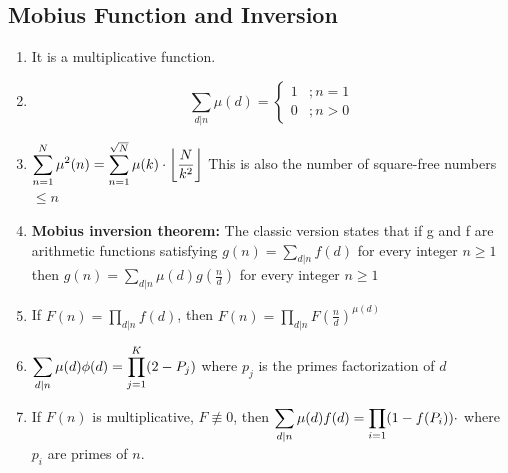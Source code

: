 \subsection{Mobius Function and Inversion}
\begin{enumerate}[resume]
    \item It is a multiplicative function.
    \item \[\sum_{d|n}\mu(d) =
    \begin{cases}
      1 & ; n=1\\
      0 & ; n > 0
    \end{cases}\]
    \item $\displaystyle \displaystyle \sum\limits_{n=1}^N {\mu}^2(n) = \displaystyle \sum\limits_{n=1}^{\sqrt{N}} \mu(k) \cdot \left \lfloor \dfrac{N}{k^2} \right\rfloor$
    This is also the number of square-free numbers $\displaystyle \le n$
    \item \textbf{Mobius inversion theorem:} The classic version states that if g and f are arithmetic functions satisfying
    $g(n) = \displaystyle \sum_{d|n}f(d) $ for every integer $n \ge 1$ then $g(n) = \displaystyle \sum_{d|n}\mu(d)g\left(\frac{n}{d}\right)$ for every integer $n \ge 1$
    \item If $\displaystyle F(n) = \displaystyle \prod_{d|n} f(d)$, then $\displaystyle F(n) = \displaystyle \prod_{d|n} F\left(\frac{n}{d}\right)^{\mu(d)}$
    \item $\displaystyle \displaystyle \sum_{d|n}\mu(d)\phi(d) = \displaystyle \prod_{j=1}^K (2 - P_j)$
    where $\displaystyle p_j$ is the primes factorization of $d$
    \item If $\displaystyle F(n)$ is multiplicative, $\displaystyle F \not\equiv 0$, then $\displaystyle \displaystyle \sum_{d|n} \mu(d) f(d) = \displaystyle \prod_{i=1} (1 - f(P_i)) \cdot$
    where $\displaystyle p_i$ are primes of $n$.
\end{enumerate}
